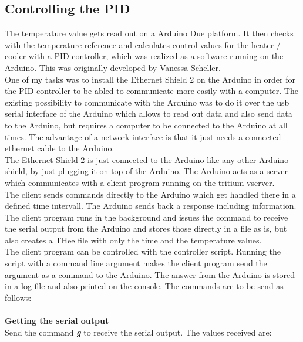 \documentclass[12pt]{scrartcl}
\begin{document}
      \subsection{Controlling the PID} \label{sec:control}
      The temperature value gets read out on a Arduino Due platform. It then
      checks with the temperature reference and calculates control values
      for the heater / cooler with a PID controller, which was realized as a
      software running on the Arduino. This was originally developed by Vanessa
      Scheller.
      \\One of my tasks was to install the Ethernet Shield 2 on the Arduino in
      order for the PID controller to be abled to communicate more easily with
      a computer. The existing possibility to communicate with the Arduino was
      to do it over the usb serial interface of the Arduino which allows to
      read out data and also send data to the Arduino, but requires a computer
      to be connected to the Arduino at all times. The advantage of a network
      interface is that it just needs a connected ethernet cable to the Arduino.
      \\The Ethernet Shield 2 is just connected to the Arduino like any other
      Arduino shield, by just plugging it on top of the Arduino. The Arduino
      acts as a server which communicates with a client program
       running on the tritium-vserver.
      \\The client sends commands directly to the Arduino which get handled
      there in a defined time intervall. The Arduino sends back a response
      including information.
      \\The client program runs in the background and issues the command to
      receive the serial output from the Arduino and stores those directly in
      a file as is, but also creates a THee file with only the time and the
      temperature values.
      \\The client program can be controlled with the
      controller script. Running the script with a
      command line argument makes the client program send the argument as a
      command to the Arduino. The answer from the Arduino is stored in a log
      file and also printed on the console.
      The commands are to be send as follows:
      \\\\
      \textbf{Getting the serial output} \\
      Send the command \textbf{\textit{g}} to receive the serial output. The values
      received are:
\end{document}
